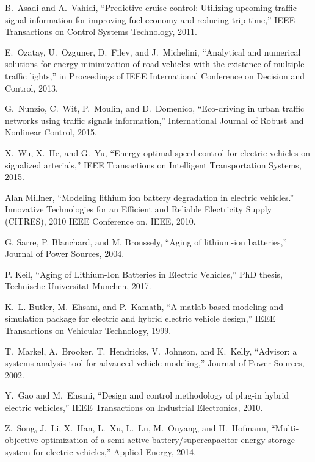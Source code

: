 B.~Asadi and A.~Vahidi, ``Predictive cruise control: Utilizing upcoming traffic
  signal information for improving fuel economy and reducing trip time,'' 
  IEEE Transactions on Control Systems Technology, 2011.

E.~Ozatay, U.~Ozguner, D.~Filev, and J.~Michelini, ``Analytical and numerical
  solutions for energy minimization of road vehicles with the existence of
  multiple traffic lights,'' in Proceedings of IEEE International
  Conference on Decision and Control, 2013.

G.~Nunzio, C.~Wit, P.~Moulin, and D.~Domenico, ``Eco-driving in urban traffic
  networks using traffic signals information,'' International Journal of
  Robust and Nonlinear Control, 2015.

X.~Wu, X.~He, and G.~Yu, ``Energy-optimal speed control for electric vehicles
  on signalized arterials,'' IEEE Transactions on Intelligent
  Transportation Systems, 2015.

Alan Millner, ``Modeling lithium ion battery degradation in electric vehicles.'' Innovative Technologies for an Efficient and Reliable Electricity Supply (CITRES), 2010 IEEE Conference on. IEEE, 2010.

G. Sarre, P. Blanchard, and M. Broussely, ``Aging of lithium-ion batteries,''
  Journal of Power Sources, 2004.
  
P. Keil, ``Aging of Lithium-Ion Batteries in Electric Vehicles,'' PhD thesis, Technische Universitat Munchen, 2017.  

K.~L. Butler, M.~Ehsani, and P.~Kamath, ``A matlab-based modeling and
  simulation package for electric and hybrid electric vehicle design,''
  IEEE Transactions on Vehicular Technology, 1999.

T.~Markel, A.~Brooker, T.~Hendricks, V.~Johnson, and K.~Kelly, ``Advisor: a
  systems analysis tool for advanced vehicle modeling,'' Journal of Power
  Sources, 2002.

Y.~Gao and M.~Ehsani, ``Design and control methodology of plug-in hybrid
  electric vehicles,'' IEEE Transactions on Industrial Electronics, 2010.

Z.~Song, J.~Li, X.~Han, L.~Xu, L.~Lu, M.~Ouyang, and H.~Hofmann,
  ``Multi-objective optimization of a semi-active battery/supercapacitor energy
  storage system for electric vehicles,'' Applied Energy, 2014.

